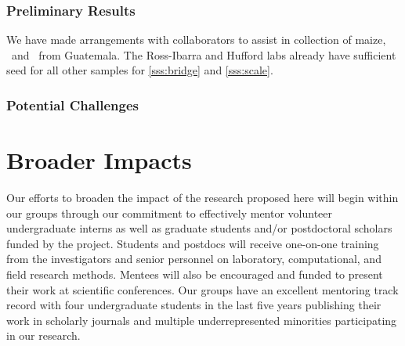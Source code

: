 \subsubsection{Preliminary Results}
We have made arrangements with collaborators to assist in collection of maize, \zl\ and \zh\ from Guatemala.  The Ross-Ibarra and Hufford labs already have sufficient seed for all other samples for \ref{sss:bridge} and \ref{sss:scale}.

\subsubsection{Potential Challenges}


\section*{Broader Impacts}

Our efforts to broaden the impact of the research proposed here will begin within our groups through our commitment to effectively mentor volunteer undergraduate interns as well as graduate students and/or postdoctoral scholars funded by the project. Students and postdocs will receive one-on-one training from the investigators and senior personnel on laboratory, computational, and field research methods.  Mentees will also be encouraged and funded to present their work at scientific conferences.  Our groups have an excellent mentoring track record with four undergraduate students in the last five years publishing their work in scholarly journals and multiple underrepresented minorities participating in our research.


